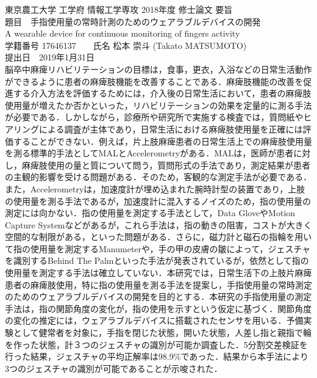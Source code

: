\thispagestyle{empty}
\begin{center}
	{\large 東京農工大学 工学府 情報工学専攻 2018年度 修士論文 要旨}\\
	\vspace{8mm}
	{\Large 題目　手指使用量の常時計測のためのウェアラブルデバイスの開発}\\
	\vspace{2mm}
	{\large A wearable device for continuous monitoring of fingers activity}\\
	\vspace{8mm}
	{\large 学籍番号 17646137　　氏名 松本 崇斗 (Takato MATSUMOTO)}\\
	\vspace{2mm}
	{\large 提出日　2019年1月31日}\\
	\vspace{4mm}
脳卒中麻痺リハビリテーションの目標は，食事，更衣，入浴などの日常生活動作ができるように患者の麻痺肢機能を改善することである．麻痺肢機能の改善を促進する介入方法を評価するためには，介入後の日常生活において，患者の麻痺肢使用量が増えたか否かといった，リハビリテーションの効果を定量的に測る手法が必要である．しかしながら，診療所や研究所で実施する検査では，質問紙やヒアリングによる調査が主体であり，日常生活における麻痺肢使用量を正確には評価することができない．例えば，片上肢麻痺患者の日常生活上での麻痺肢使用量を測る標準的手法としてMALとAccelerometryがある．MALは，医師が患者に対し，麻痺肢使用の量と質について問う，質問形式の手法であり，測定結果が患者の主観的影響を受ける問題がある．そのため，客観的な測定手法が必要である．また，Accelerometryは，加速度計が埋め込まれた腕時計型の装置であり，上肢の使用量を測る手法であるが，加速度計に混入するノイズのため，指の使用量の測定には向かない．指の使用量を測定する手法として，Data GloveやMotion Capture Systemなどがあるが，これら手法は，指の動きの阻害，コストが大きく空間的な制限がある，といった問題がある．さらに，磁力計と磁石の指輪を用いて指の使用量を測定するManumeterや，手の甲の皮膚の皺によって，ジェスチャを識別するBehind The Palmといった手法が発表されているが，依然として指の使用量を測定する手法は確立していない．本研究では，日常生活下の上肢片麻痺患者の麻痺肢使用，特に指の使用量を測る手法を提案し，手指使用量の常時測定のためのウェアラブルデバイスの開発を目的とする．本研究の手指使用量の測定手法は，指の関節角度の変化が，指の使用を示すという仮定に基づく．関節角度の変化の推定には，ウェアラブルデバイスに搭載されたセンサを用いる．予備実験として健常者を対象に，手指を閉じた状態，開いた状態，人差し指と親指で輪を作った状態，計３つのジェスチャの識別が可能か調査した．5分割交差検証を行った結果，ジェスチャの平均正解率は98.9\%であった．結果から本手法により3つのジェスチャの識別が可能であることが示唆された．
\end{center}













